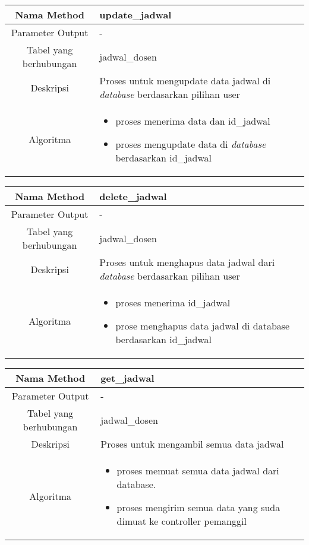 \begin{tabular}{|c|p{11cm}|}
\hline
Nama Method 	& 	update\_jadwal 	\\
\hline
Parameter Output & - \\
\hline
Tabel yang berhubungan & jadwal\_dosen \\
\hline
Deskripsi	& Proses untuk mengupdate data jadwal di \textit{database} berdasarkan pilihan user\\
\hline
Algoritma	& \begin{itemize}
				\item proses menerima data dan id\_jadwal
				\item proses mengupdate data di \textit{database} berdasarkan id\_jadwal
				\end{itemize} \\
\hline
\end{tabular}

\begin{tabular}{|c|p{11cm}|}
\hline
Nama Method 	& 	delete\_jadwal 	\\
\hline
Parameter Output & - \\
\hline
Tabel yang berhubungan & jadwal\_dosen \\
\hline
Deskripsi	& Proses untuk menghapus data jadwal dari \textit{database} berdasarkan pilihan user \\
\hline
Algoritma	& \begin{itemize}
				\item proses menerima id\_jadwal
				\item prose menghapus data jadwal di database berdasarkan id\_jadwal
				\end{itemize} \\
\hline
\end{tabular}

\begin{tabular}{|c|p{11cm}|}
\hline
Nama Method 	& 	get\_jadwal 	\\
\hline
Parameter Output & - \\
\hline
Tabel yang berhubungan & jadwal\_dosen \\
\hline
Deskripsi	& Proses untuk mengambil semua data jadwal \\
\hline
Algoritma	& \begin{itemize}
				\item proses memuat semua data jadwal dari database.
				\item proses mengirim semua data yang suda dimuat ke controller pemanggil
				\end{itemize} \\
\hline
\end{tabular}

